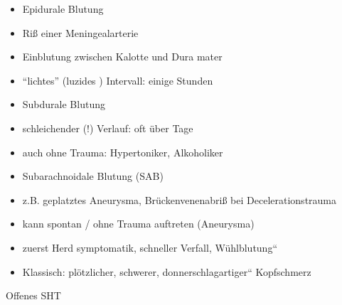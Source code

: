\documentclass{article}
\begin{document}
\begin{itemize}
\item {}Epidurale Blutung 

\end{itemize}
\begin{itemize}
\item Ri{\ss} einer Meningealarterie

\item Einblutung zwischen Kalotte und Dura mater

\item {\textquotedblleft}lichtes{\textquotedblright} (luzides )
Intervall: einige Stunden

\end{itemize}
\begin{itemize}
\item {}Subdurale  Blutung 

\end{itemize}
\begin{itemize}
\item schleichender  (!) Verlauf: oft \"uber Tage

\item auch ohne  Trauma: Hypertoniker, Alkoholiker

\end{itemize}
\begin{itemize}
\item {}Subarachnoidale  Blutung
(SAB)

\end{itemize}
\begin{itemize}
\item z.B. geplatztes Aneurysma, Br\"uckenvenenabri{\ss} bei
Decelerationstrauma

\end{itemize}
\begin{itemize}
\item kann spontan / ohne Trauma auftreten (Aneurysma)

\end{itemize}
\begin{itemize}
\item zuerst Herd symptomatik, schneller  Verfall, 
{\quotedblbase}W\"uhlblutung{\textquotedblleft}

\item Klassisch: pl\"otzlicher, schwerer,
{\quotedblbase}donnerschlagartiger{\textquotedblleft} Kopfschmerz

\end{itemize}
Offenes SHT
\end{document}
